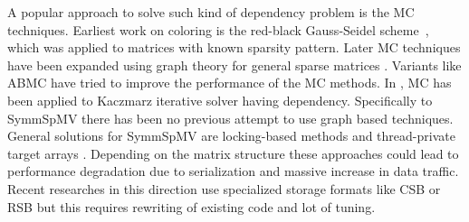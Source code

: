 A popular approach to solve such kind of dependency problem is  the
\acrfull{MC} techniques. Earliest work on coloring is the red-black 
Gauss-Seidel scheme~\cite{RBGS}, which was applied to  matrices with
 known sparsity pattern. 
Later \acrlong{MC} techniques have been expanded using graph theory
for general sparse matrices \cite{MC, COLPACK}.
Variants like \acrfull{ABMC} \cite{ABMC} have tried to improve the performance 
of the \acrshort{MC} methods. 
In \cite{feast_mc}, \acrshort{MC} has been applied to Kaczmarz iterative solver
having \DTWO dependency.
Specifically to \acrshort{SymmSpMV} there has been no previous attempt to use 
graph based techniques. General solutions for \acrshort{SymmSpMV} are 
locking-based methods and thread-private target arrays \cite{sparseX,thread_private_symm_spmv}.
Depending on the matrix structure these approaches could lead to performance
 degradation  due to serialization and massive increase in data traffic.
Recent researches in this direction use specialized storage formats like
 CSB \cite{CSB} or RSB \cite{RSB} but this requires rewriting of existing 
 code and lot of tuning.

 

